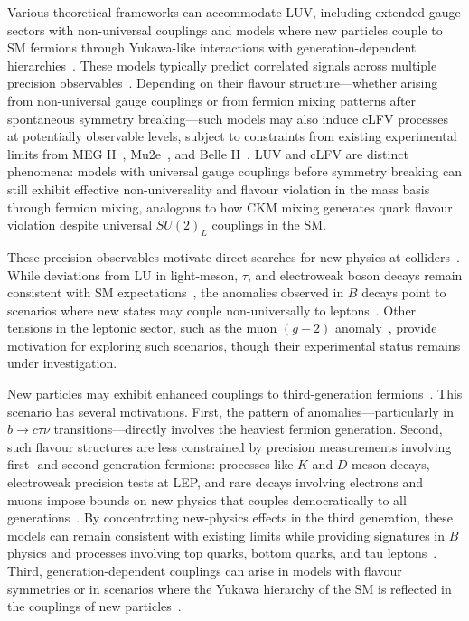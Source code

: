 Various theoretical frameworks can accommodate LUV, including extended gauge sectors with non-universal couplings and models where new particles couple to SM fermions through Yukawa-like interactions with generation-dependent hierarchies~\cite{DiLuzio:2017vat,Greljo:2018tuh,Angelescu:2021lln}. These models typically predict correlated signals across multiple precision observables~\cite{Greljo:2022jac,Ciuchini:2022wbq,Allwicher:2022gkm}. Depending on their flavour structure---whether arising from non-universal gauge couplings or from fermion mixing patterns after spontaneous symmetry breaking---such models may also induce cLFV processes at potentially observable levels, subject to constraints from existing experimental limits from MEG II~\cite{MEGII:2025gzr}, Mu2e~\cite{Ganguly:2022ufq}, and Belle II~\cite{Belle-II:2018jsg,Blankenburg:2012nx,Angelescu:2018tyl}. LUV and cLFV are distinct phenomena: models with universal gauge couplings before symmetry breaking can still exhibit effective non-universality and flavour violation in the mass basis through fermion mixing, analogous to how CKM mixing generates quark flavour violation despite universal $SU(2)_L$ couplings in the SM.

These precision observables motivate direct searches for new physics at colliders~\cite{CMS:2020wzx,ATLAS:2019qpq}. While deviations from LU in light-meson, $\tau$, and electroweak boson decays remain consistent with SM expectations~\cite{1674-1137-40-10-100001,LEPEW:2006}, the anomalies observed in $B$ decays point to scenarios where new states may couple non-universally to leptons~\cite{Buttazzo:2017ixm}. Other tensions in the leptonic sector, such as the muon $(g-2)$ anomaly~\cite{Abi_2021,Aoyama:2020ynm,ALIBERTI20251}, provide motivation for exploring such scenarios, though their experimental status remains under investigation. 

New particles may exhibit enhanced couplings to third-generation fermions~\cite{Greljo:2018tuh,DiLuzio:2018zxy}. This scenario has several motivations. First, the pattern of anomalies---particularly in $b\to c\tau\nu$ transitions---directly involves the heaviest fermion generation. Second, such flavour structures are less constrained by precision measurements involving first- and second-generation fermions: processes like $K$ and $D$ meson decays, electroweak precision tests at LEP, and rare decays involving electrons and muons impose bounds on new physics that couples democratically to all generations~\cite{1674-1137-40-10-100001,LEPEW:2006}. By concentrating new-physics effects in the third generation, these models can remain consistent with existing limits while providing signatures in $B$ physics and processes involving top quarks, bottom quarks, and tau leptons~\cite{Angelescu:2021lln,Cornella:2021sby}. Third, generation-dependent couplings can arise in models with flavour symmetries or in scenarios where the Yukawa hierarchy of the SM is reflected in the couplings of new particles~\cite{Greljo:2018tuh,DiLuzio:2018zxy}.

